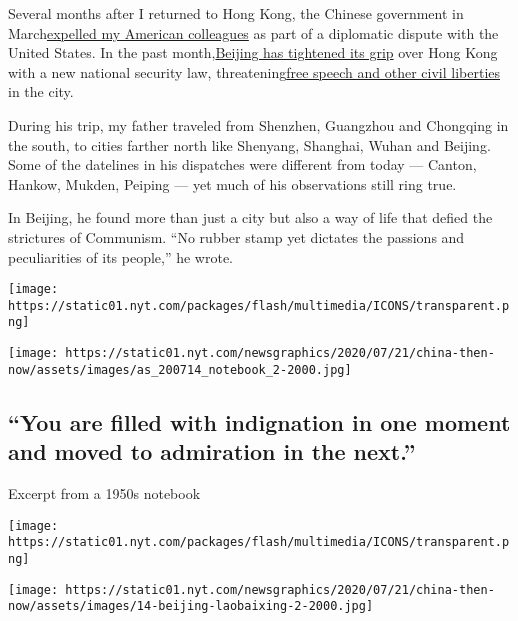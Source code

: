Several months after I returned to Hong Kong, the Chinese government in
March\href{https://www.nytimes.com/2020/03/18/world/asia/china-expels-journalists.html}{}\href{https://www.nytimes.com/2020/03/18/world/asia/china-expels-journalists.html}{expelled
my American colleagues} as part of a diplomatic dispute with the United
States. In the past
month,\href{https://www.nytimes.com/2020/06/29/world/asia/china-hong-kong-security-law-rules.html?action=click\&module=RelatedLinks\&pgtype=Article}{}\href{https://www.nytimes.com/2020/06/29/world/asia/china-hong-kong-security-law-rules.html?action=click\&module=RelatedLinks\&pgtype=Article}{Beijing
has tightened its grip} over Hong Kong with a new national security law,
threatening\href{https://www.nytimes.com/2020/07/01/world/asia/hong-kong-security-law-china.html}{}\href{https://www.nytimes.com/2020/07/01/world/asia/hong-kong-security-law-china.html}{free
speech and other civil liberties} in the city.

During his trip, my father traveled from Shenzhen, Guangzhou and
Chongqing in the south, to cities farther north like Shenyang, Shanghai,
Wuhan and Beijing. Some of the datelines in his dispatches were
different from today --- Canton, Hankow, Mukden, Peiping --- yet much of
his observations still ring true.

In Beijing, he found more than just a city but also a way of life that
defied the strictures of Communism. ``No rubber stamp yet dictates the
passions and peculiarities of its people,'' he wrote.

\texttt{[image: https://static01.nyt.com/packages/flash/multimedia/ICONS/transparent.png]}

\texttt{[image: https://static01.nyt.com/newsgraphics/2020/07/21/china-then-now/assets/images/as\_200714\_notebook\_2-2000.jpg]}

\hypertarget{you-are-filled-with-indignation-in-one-moment-and-moved-to-admiration-in-the-next}{%
\subsection{``You are filled with indignation in one moment and moved to
admiration in the
next.''}\label{you-are-filled-with-indignation-in-one-moment-and-moved-to-admiration-in-the-next}}

Excerpt from a 1950s notebook

\texttt{[image: https://static01.nyt.com/packages/flash/multimedia/ICONS/transparent.png]}

\texttt{[image: https://static01.nyt.com/newsgraphics/2020/07/21/china-then-now/assets/images/14-beijing-laobaixing-2-2000.jpg]}

